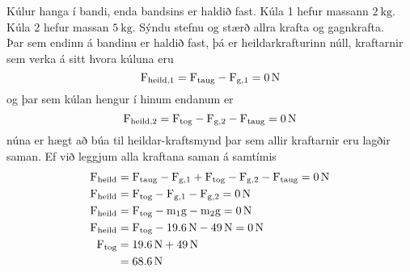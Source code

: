 \begin{formalexample}
\begin{wrapfigure}{r}{0.25\textwidth}
	\vspace{-20pt}
	\begin{center}
	\end{center}
	\vspace{-10pt}
\end{wrapfigure}
Kúlur hanga í bandi, enda bandsins er haldið fast. Kúla 1 hefur massann 
$\SI{2}{\kg}$. Kúla 2 hefur massan $\SI{5}{\kg}$. Sýndu stefnu og stærð 
allra krafta og gagnkrafta.
\\[4 ex]
Þar sem endinn á bandinu er haldið fast, þá er heildarkrafturinn núll, kraftarnir
sem verka á sitt hvora kúluna eru
\[
	\textrm{F}_\text{heild,1} = \textrm{F}_\text{taug} - \textrm{F}_{\textrm{g},1} 
	= \SI{0}{\newton}
\]
og þar sem kúlan hengur í hinum endanum er
\[
	\textrm{F}_\text{heild,2} = \textrm{F}_\text{tog} 
		- \textrm{F}_{\textrm{g},2} - \textrm{F}_\text{taug} 
	= \SI{0}{\newton}
\]
núna er hægt að búa til heildar-kraftsmynd þar sem allir kraftarnir eru lagðir saman.
Ef við leggjum alla kraftana saman á samtímis
\begin{align*}
	\textrm{F}_\text{heild} &= \textrm{F}_\text{taug} - \textrm{F}_{\textrm{g},1}
		+ \textrm{F}_\text{tog} - \textrm{F}_{\textrm{g},2} - \textrm{F}_\text{taug}
		= \SI{0}{\newton} \\
	\textrm{F}_\text{heild} &= \textrm{F}_\text{tog} - \textrm{F}_{\textrm{g},1}
		- \textrm{F}_{\textrm{g},2} 
		= \SI{0}{\newton} \\
	\textrm{F}_\text{heild} &= \textrm{F}_\text{tog} - \textrm{m}_1 \textrm{g}
		- \textrm{m}_2 \textrm{g}
		= \SI{0}{\newton} \\
	\textrm{F}_\text{heild} &= \textrm{F}_\text{tog} - \SI{19.6}{\newton}
		- \SI{49}{\newton}
		= \SI{0}{\newton} \\
	\textrm{F}_\text{tog} &= \SI{19.6}{\newton}
		+ \SI{49}{\newton}
		\\
	 &= \SI{68.6}{\newton}
\end{align*}
\end{formalexample}
